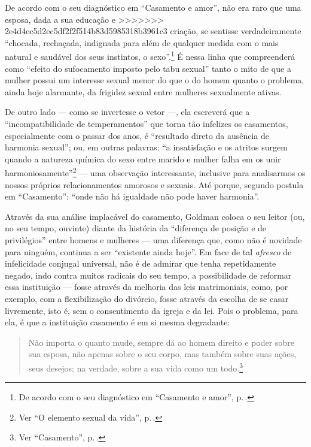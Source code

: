 {De acordo com o seu diagnóstico em
``Casamento e amor'', não era raro que uma esposa, dada a sua educação e
>>>>>>> 2e4d4ec5d2ec5df2f2f514b83d5985318b3961c3
criação, se sentisse verdadeiramente ``chocada, rechaçada, indignada
para além de qualquer medida com o mais natural e saudável dos seus
instintos, o sexo''.\footnote{De acordo com o seu diagnóstico em
``Casamento e amor'', p.\,\pageref{artesao}.}
É nessa linha que compreenderá como ``efeito do
sufocamento imposto pelo tabu sexual'' tanto o mito de que a mulher
possui um interesse sexual menor do que o do homem quanto o problema,
ainda hoje alarmante, da frigidez sexual entre mulheres sexualmente
ativas.

De outro lado --- como se invertesse o vetor ---,
ela escreverá que a
``incompatibilidade de temperamentos'' que torna tão infelizes os
casamentos, especialmente com o passar dos anos, é ``resultado direto da
ausência de harmonia sexual''; ou, em outras palavras: ``a insatisfação
e os atritos surgem quando a natureza química do sexo entre marido e
mulher falha em os unir harmoniosamente''\footnote{Ver ``O elemento sexual da vida'', p.\,\pageref{unir}.} --- uma observação
interessante, inclusive para analisarmos os nossos próprios
relacionamentos amorosos e sexuais. Até porque, segundo postula em
``Casamento'': ``onde não há igualdade não pode haver harmonia''.

Através da sua análise implacável do casamento, Goldman coloca o seu
leitor (ou, no seu tempo, ouvinte) diante da história da ``diferença de
posição e de privilégios'' entre homens e mulheres ---
uma diferença que, como não é novidade para ninguém, continua a ser
``existente ainda hoje''. Em face de tal \textit{afresco} de infelicidade
conjugal universal, não é de admirar que tenha repetidamente negado,
indo contra muitos radicais do seu tempo, a possibilidade de reformar
essa instituição --- fosse através da melhoria das leis
matrimoniais, como, por exemplo, com a flexibilização do divórcio, fosse
através da escolha de se casar livremente, isto é, sem o consentimento
da igreja e da lei. Pois o problema, para ela, é que a instituição
casamento é em si mesma degradante:

\begin{quote}
Não importa o quanto mude, sempre dá ao homem direito e poder sobre sua esposa, não apenas sobre o seu corpo, mas também sobre suas ações, seus desejos; na verdade, sobre a
sua vida como um todo.\footnote{Ver ``Casamento'', p.\,\pageref{cruel}.}
\end{quote}

}
